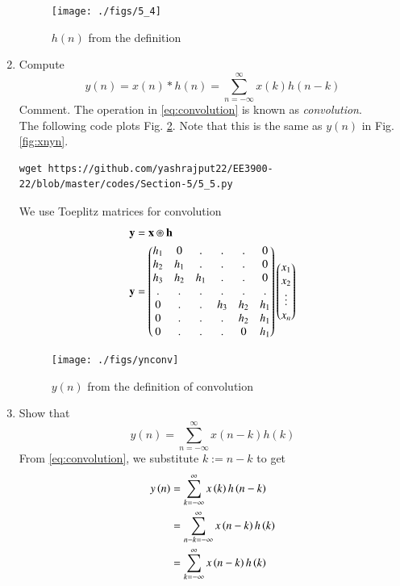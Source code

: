 \begin{enumerate}[label=\thesection.\arabic*]
\begin{figure}[!ht]
\texttt{[image: ./figs/5\_4]}
\caption{$h(n)$ from the definition}
\label{fig:hndef}
\end{figure}
%
\item Compute 
%
\begin{equation}
\label{eq:convolution}
y(n) = x(n)*h(n) = \sum_{n=-\infty}^{\infty}x(k)h(n-k)
\end{equation}
%
Comment. The operation in \eqref{eq:convolution} is known as
{\em convolution}.
%
\\
\solution The following code plots Fig. \ref{fig:ynconv}. Note that this is the same as 
$y(n)$ in  Fig. 
\ref{fig:xnyn}. 
%
\begin{lstlisting}
wget https://github.com/yashrajput22/EE3900-22/blob/master/codes/Section-5/5_5.py
\end{lstlisting}
We use Toeplitz matrices for convolution
\begin{align}
	\mathbf{y} &= \mathbf{x} \circledast \mathbf{h}\\
	\mathbf{y} &= 
	\begin{pmatrix}
		h_1 & 0 & . & . & . & 0 \\
		h_2 & h_1 & . & . & . & 0 \\
		h_3 & h_2 & h_1 & . & . & 0 \\
		. & . & . & . & . & . \\
		0 & . & . & h_3 & h_2 & h_1 \\
		0 & . & . & . & h_2 & h_1 \\
		0 & . & . & . & 0 & h_1
	\end{pmatrix}
	\begin{pmatrix}
		x_1 \\ x_2 \\ \vdots \\ x_n
	\end{pmatrix}
\end{align}
\begin{figure}[!ht]
\centering
\texttt{[image: ./figs/ynconv]}
\caption{$y(n)$ from the definition of convolution}
\label{fig:ynconv}
\end{figure}
\item Show that
\begin{equation}
y(n) =  \sum_{n=-\infty}^{\infty}x(n-k)h(k)
\end{equation}
\solution
From \eqref{eq:convolution}, we substitute $k := n - k$ to get
\begin{align}
y\left(n\right) &= \sum_{k=-\infty}^{\infty}x\left(k\right)h\left(n - k\right) \\
		  &= \sum_{n - k=-\infty}^{\infty}x\left(n - k\right)h\left(k\right) \\
		  &= \sum_{k=-\infty}^{\infty}x\left(n - k\right)h\left(k\right)
\end{align}
\end{enumerate}
%
